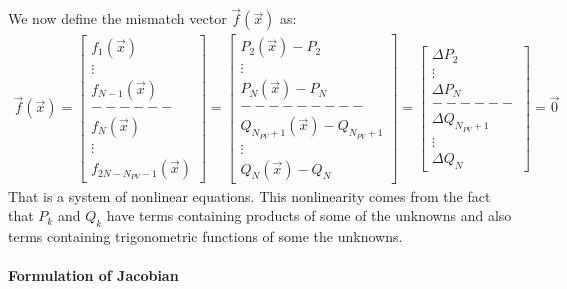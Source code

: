 We now define the mismatch vector $\vec{f} (\vec{x})$ as:
\begin{align*}
\vec{f} (\vec{x}) = \left [ \begin{array}{c} f_{1}(\vec{x})  \\ \vdots \\ f_{N-1}(\vec{x}) \\ ------ \\ f_{N}(\vec{x}) \\ \vdots \\ f_{2N-N_{PV} -1}(\vec{x}) \end{array} \right ] 
				 = \left [ \begin{array}{c} P_{2}(\vec{x}) - P_{2}  \\ \vdots \\ P_{N}(\vec{x}) - P_{N} \\ --------- \\ Q_{N_{PV}+1}(\vec{x}) - Q_{N_{PV}+1} \\ \vdots \\ Q_{N}(\vec{x}) - Q_{N} 			                   \end{array} \right]
				 = \left [ \begin{array}{c} \Delta P_{2} \\ \vdots \\ \Delta P_{N} \\ ------ \\ \Delta Q_{N_{PV}+1} \\ \vdots \\ \Delta Q_{N} \end{array} \right ]
				 = \vec{0}
\end{align*}
That is a system of nonlinear equations. This nonlinearity comes from the fact that $P_{k}$ and $Q_{k}$ have terms containing products of some of the unknowns and also terms containing trigonometric functions of some the unknowns. 

\paragraph{Formulation of Jacobian} \mbox{}\\

